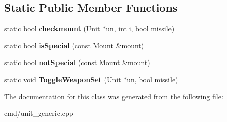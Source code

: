 \subsection*{Static Public Member Functions}
\begin{DoxyCompactItemize}
\item 
static bool {\bfseries checkmount} (\hyperlink{classUnit}{Unit} $\ast$un, int i, bool missile)\hypertarget{classWeaponComparator_a3f2eb8cc4c509f4e23028bdcda714565}{}\label{classWeaponComparator_a3f2eb8cc4c509f4e23028bdcda714565}

\item 
static bool {\bfseries is\+Special} (const \hyperlink{classMount}{Mount} \&mount)\hypertarget{classWeaponComparator_a663277db58fbe56d42d6ef6f47b11d83}{}\label{classWeaponComparator_a663277db58fbe56d42d6ef6f47b11d83}

\item 
static bool {\bfseries not\+Special} (const \hyperlink{classMount}{Mount} \&mount)\hypertarget{classWeaponComparator_a7bb16fe7a88eee707f36bb72e55521f6}{}\label{classWeaponComparator_a7bb16fe7a88eee707f36bb72e55521f6}

\item 
static void {\bfseries Toggle\+Weapon\+Set} (\hyperlink{classUnit}{Unit} $\ast$un, bool missile)\hypertarget{classWeaponComparator_a2c7c0a2bf60fa84dda7fe839c414898f}{}\label{classWeaponComparator_a2c7c0a2bf60fa84dda7fe839c414898f}

\end{DoxyCompactItemize}


The documentation for this class was generated from the following file\+:\begin{DoxyCompactItemize}
\item 
cmd/unit\+\_\+generic.\+cpp\end{DoxyCompactItemize}
